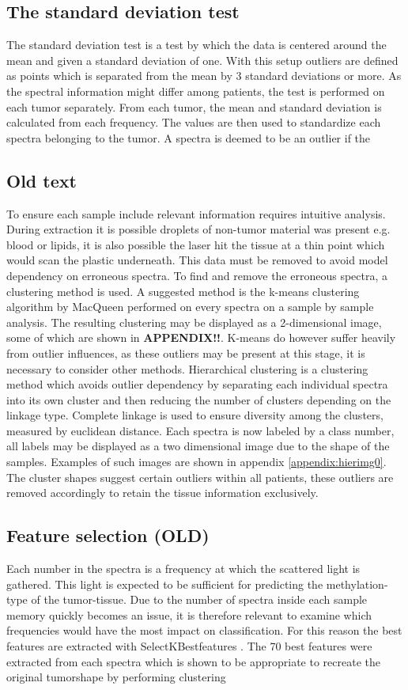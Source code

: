 \subsection{The standard deviation test}

The standard deviation test is a test by which the data is centered around the mean and given a standard deviation of one. With this setup outliers are defined as points which is separated from the mean by 3 standard deviations or more. As the spectral information might differ among patients, the test is performed on each tumor separately. From each tumor, the mean and standard deviation is calculated from each frequency. The values are then used to standardize each spectra belonging to the tumor. A spectra is deemed to be an outlier if the 

\subsection{Old text}
To ensure each sample include relevant information requires intuitive analysis. During extraction it is possible droplets of non-tumor material was present e.g. blood or lipids, it is also possible the laser hit the tissue at a thin point which would scan the plastic underneath. This data must be removed to avoid model dependency on erroneous spectra. To find and remove the erroneous spectra, a clustering method is used. A suggested method is the k-means clustering algorithm by MacQueen \cite{macqueen} performed on every spectra on a sample by sample analysis. The resulting clustering may be displayed as a 2-dimensional image, some of which are shown in \textbf{APPENDIX!!}. K-means do however suffer heavily from outlier influences, as these outliers may be present at this stage, it is necessary to consider other methods. Hierarchical clustering is a clustering method which avoids outlier dependency by separating each individual spectra into its own cluster and then reducing the number of clusters depending on the linkage type. Complete linkage is used to ensure diversity among the clusters, measured by euclidean distance\cite{scikit}. Each spectra is now labeled by a class number, all labels may be displayed as a two dimensional image due to the shape of the samples. Examples of such images are shown in appendix \ref{appendix:hierimg0}. The cluster shapes suggest certain outliers within all patients, these outliers are removed accordingly to retain the tissue information exclusively.

\subsection{Feature selection (OLD)}


Each number in the spectra is a frequency at which the scattered light is gathered. This light is expected to be sufficient for predicting the methylation-type of the tumor-tissue. Due to the number of spectra inside each sample memory quickly becomes an issue, it is therefore relevant to examine which frequencies would have the most impact on classification. For this reason the best features are extracted with SelectKBestfeatures \cite{scikit}. The 70 best features were extracted from each spectra which is shown to be appropriate to recreate the original tumorshape by performing clustering 